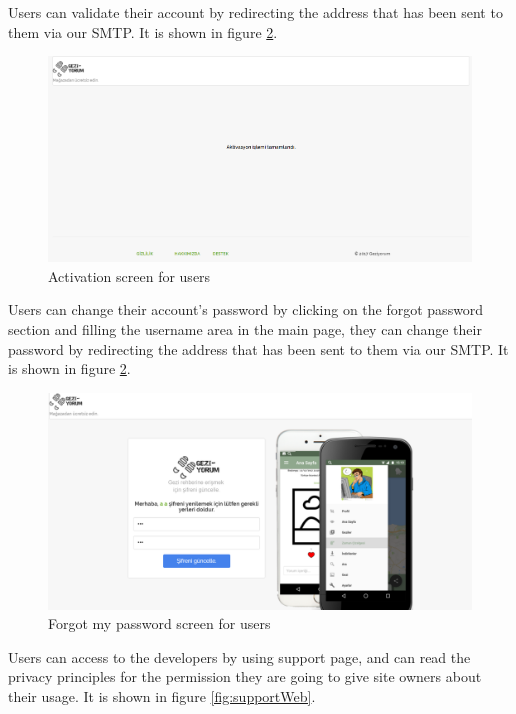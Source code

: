 Users can validate their account by redirecting the address that has been sent to them via our SMTP. It is shown in figure  \ref{fig:registerWeb}. 

\begin{figure}[!htbp]
\centering
\includegraphics[width=\textwidth]{projectChapters/images/activasion.png}
\caption{Activation screen for users}
\label{fig:registerWeb}
\end{figure}

\newpage

Users can change their account's password by clicking on the forgot password section and filling the username area in the main page, they can change their password by redirecting the address that has been sent to them via our SMTP. It is shown in figure  \ref{fig:registerWeb}. 

\begin{figure}[!htbp]
\centering
\includegraphics[width=\textwidth]{projectChapters/images/forgetpass.png}
\caption{Forgot my password screen for users}
\label{fig:registerWeb}
\end{figure}

Users can access to the developers by using support page, and can read the privacy principles for the permission they are going to give site owners about their usage. It is shown in figure  \ref{fig:supportWeb}. 

